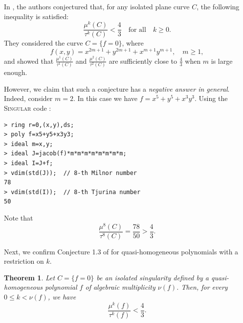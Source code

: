 \documentclass[12pt,letterpaper]{amsart}
\newtheorem{theorem}{Theorem}[section]
\begin{document}
\par In \cite[Conjecture 1.3]{Hussain_1}, the authors conjectured that, for any isolated plane curve $C$, the following inequality is satisfied:
\[
\frac{\mu^{k}(C)}{\tau^{k}(C)}<\frac{4}{3}\quad\text{for all}\quad k\geq 0.
\]
They considered the curve $C=\{f=0\}$, where
\[
f(x,y)=x^{2m+1}+y^{2m+1}+x^{m+1}y^{m+1},\quad m\geq 1,
\]
and showed that $\frac{\mu^{1}(C)}{\tau^{1}(C)}$ and $\frac{\mu^{2}(C)}{\tau^{2}(C)}$ are sufficiently close to $\frac{4}{3}$ when $m$ is large enough.

\par However, we claim that such a conjecture has a \textit{negative answer in general}. Indeed, consider $m=2$. In this case we have $f=x^5+y^5+x^3y^3$. Using the \textsc{Singular} code \cite{Singular}:

\begin{verbatim}
> ring r=0,(x,y),ds;
> poly f=x5+y5+x3y3;
> ideal m=x,y;
> ideal J=jacob(f)*m*m*m*m*m*m*m*m;
> ideal I=J+f;
> vdim(std(J));  // 8-th Milnor number
78
> vdim(std(I));  // 8-th Tjurina number 
50
\end{verbatim}

Note that
\begin{equation}\label{ex_conjectura}
\frac{\mu^{8}(C)}{\tau^{8}(C)}=\frac{78}{50}>\frac{4}{3}.
\end{equation}

\par
Next, we confirm Conjecture 1.3 of \cite{Hussain_1} for quasi-homogeneous polynomials with a restriction on $k$.

\begin{theorem}\label{teo_conje}
Let $C=\{ f=0\}$ be an isolated singularity defined by a quasi-homogeneous polynomial $f$ of algebraic multiplicity $\nu(f)$. Then, for every $0\leq k<\nu(f)$, we have
\[
\frac{\mu^{k}(f)}{\tau^{k}(f)}<\frac{4}{3}.
\]
\end{theorem}
\end{document}
